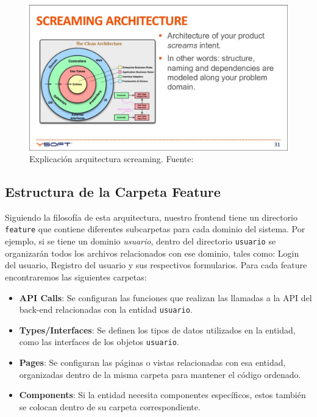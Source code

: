 \begin{figure}[H]
    \centering
    \includegraphics[width=\textwidth]{fotos/explication-screaming.jpg}
    \caption{Explicación arquitectura screaming. Fuente: \cite{speakerdeck_screaming}}
    \label{fig:scream}
\end{figure}

\subsection{Estructura de la Carpeta Feature}
Siguiendo la filosofía de esta arquitectura, nuestro frontend tiene un directorio \texttt{feature} que contiene diferentes subcarpetas para cada dominio del sistema. Por ejemplo, si se tiene un dominio \textit{usuario}, dentro del directorio \texttt{usuario} se organizarán todos los archivos relacionados con ese dominio, tales como: Login del usuario, Registro del usuario y sus respectivos formularios. Para cada feature encontraremos las siguientes carpetas:


\begin{itemize}
    \item \textbf{API Calls}: Se configuran las funciones que realizan las llamadas a la API del back-end relacionadas con la entidad \texttt{usuario}.
    \item \textbf{Types/Interfaces}: Se definen los tipos de datos utilizados en la entidad, como las interfaces de los objetos \texttt{usuario}.
    \item \textbf{Pages}: Se configuran las páginas o vistas relacionadas con esa entidad, organizadas dentro de la misma carpeta para mantener el código ordenado.
    \item \textbf{Components}: Si la entidad necesita componentes específicos, estos también se colocan dentro de su carpeta correspondiente.
\end{itemize}

